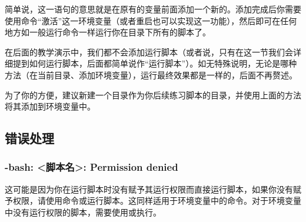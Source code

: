 简单说，这一语句的意思就是在原有的变量前面添加一个新的。添加完成后你需要使用命令“激活”这一环境变量（或者重启也可以实现这一功能），然后即可在任何地方如一般运行命令一样运行你在目录下所有的脚本了。

\begin{attention}
    在后面的教学演示中，我们都不会添加运行脚本（或者说，只有在这一节我们会详细提到如何运行脚本，后面都简单说作“运行脚本”）。如无特殊说明，无论是哪种方法（在当前目录、添加环境变量），运行最终效果都是一样的，后面不再赘述。

    为了你的方便，建议新建一个目录作为你后续练习脚本的目录，并使用上面的方法将其添加到环境变量中。
\end{attention}


\subsection{错误处理}\label{subsec:第一个脚本-错误处理}

\subsubsection{-bash: <脚本名>: Permission denied}

这可能是因为你在运行脚本时没有赋予其运行权限而直接运行脚本，如果你没有赋予权限，请使用命令或运行脚本。这同样适用于环境变量中的命令。对于环境变量中没有运行权限的脚本，需要使用或执行。